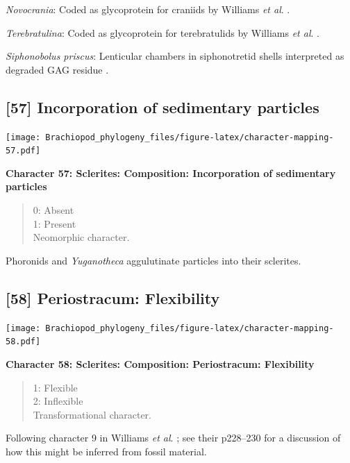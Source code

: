 \documentclass[]{book}
\theoremstyle{definition}
\theoremstyle{definition}
\theoremstyle{definition}
\theoremstyle{remark}
\begin{document}
\emph{Novocrania}: Coded as glycoprotein for craniids by Williams
\emph{et al}. \citeyearpar{Williams1996Asupra}.

\emph{Terebratulina}: Coded as glycoprotein for terebratulids by
Williams \emph{et al}. \citeyearpar{Williams1996Asupra}.

\emph{Siphonobolus priscus}: Lenticular chambers in siphonotretid shells
interpreted as degraded GAG residue
\citep{Williams2004Chemicostructure}.

\hypertarget{incorporation-of-sedimentary-particles}{%
\subsection*{{[}57{]} Incorporation of sedimentary
particles}\label{incorporation-of-sedimentary-particles}}

\texttt{[image: Brachiopod\_phylogeny\_files/figure-latex/character-mapping-57.pdf]}

\textbf{Character 57: Sclerites: Composition: Incorporation of
sedimentary particles}

\begin{quote}
0: Absent\\
1: Present\\
Neomorphic character.
\end{quote}

Phoronids and \emph{Yuganotheca} aggulutinate particles into their
sclerites.

\hypertarget{periostracum-flexibility}{%
\subsection*{{[}58{]} Periostracum:
Flexibility}\label{periostracum-flexibility}}

\texttt{[image: Brachiopod\_phylogeny\_files/figure-latex/character-mapping-58.pdf]}

\textbf{Character 58: Sclerites: Composition: Periostracum: Flexibility}

\begin{quote}
1: Flexible\\
2: Inflexible\\
Transformational character.
\end{quote}

Following character 9 in Williams \emph{et al}.
\citeyearpar{Williams1998Thediversity}; see their p228--230 for a
discussion of how this might be inferred from fossil material.
\end{document}
